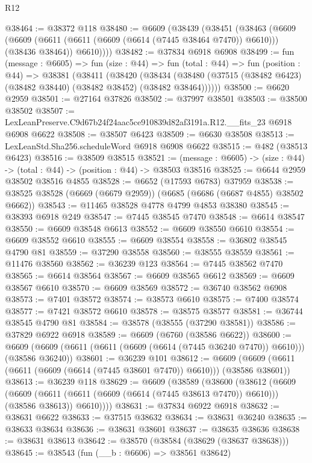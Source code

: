 \begin{lexlean}{R12}
\begin{coremodule}
@38464 := @38372 @118
@38480 := @6609
    (@38439
      (@38451
        (@38463
          (@6609
            (@6609 (@6611 (@6611 (@6609 (@6614 (@7445 @38464 @7470)) @6610))) (@38436 @38464))
            @6610))))
@38482 := @37834 @6918 @6908
@38499 := fun (message : @6605) =>
  fun (size : @44) =>
  fun (total : @44) =>
  fun (position : @44) =>
  @38381
    (@38411
      (@38420
        (@38434 (@38480 (@37515 (@38482 @6423) (@38482 @38440) (@38482 @38452) (@38482 @38464))))))
@38500 := @6620 @2959
@38501 := @27164 @37826
@38502 := @37997 @38501
@38503 := @38500 @38502
@38507 := LexLeanPreserve.C9d67b24f24aac5ce910839d82af3191a.R12.__fits_23 @6918 @6908 @6622
@38508 := @38507 @6423
@38509 := @6630 @38508
@38513 := LexLeanStd.Sha256.scheduleWord @6918 @6908 @6622
@38515 := @482 (@38513 @6423)
@38516 := @38509 @38515
@38521 := (message : @6605) -> (size : @44) -> (total : @44) -> (position : @44) -> @38503 @38516
@38525 := @6644 @2959 @38502 @38516 @4855
@38528 := @6652 (@17593 @6783) @37959
@38538 := @38525 @38528 (@6669 (@6679 @2959)) (@6685 (@6686 (@6687 @4855) @38502 @6662))
@38543 := @11465 @38528 @4778 @4799 @4853 @38380
@38545 := @38393 @6918 @249
@38547 := @7445 @38545 @7470
@38548 := @6614 @38547
@38550 := @6609 @38548 @6613
@38552 := @6609 @38550 @6610
@38554 := @6609 @38552 @6610
@38555 := @6609 @38554
@38558 := @36802 @38545 @4790 @81
@38559 := @37290 @38558
@38560 := @38555 @38559
@38561 := @11476 @38560
@38562 := @36239 @123
@38564 := @7445 @38562 @7470
@38565 := @6614 @38564
@38567 := @6609 @38565 @6612
@38569 := @6609 @38567 @6610
@38570 := @6609 @38569
@38572 := @36740 @38562 @6908
@38573 := @7401 @38572
@38574 := @38573 @6610
@38575 := @7400 @38574
@38577 := @7421 @38572 @6610
@38578 := @38575 @38577
@38581 := @36744 @38545 @4790 @81
@38584 := @38578 (@38555 (@37290 @38581))
@38586 := @37829 @6922 @6918
@38589 := @6609 (@6760 (@38586 @6622))
@38600 := @6609 (@6609 (@6611 (@6611 (@6609 (@6614 (@7445 @36240 @7470)) @6610))) (@38586 @36240))
@38601 := @36239 @101
@38612 := @6609 (@6609 (@6611 (@6611 (@6609 (@6614 (@7445 @38601 @7470)) @6610))) (@38586 @38601))
@38613 := @36239 @118
@38629 := @6609
    (@38589
      (@38600
        (@38612
          (@6609
            (@6609 (@6611 (@6611 (@6609 (@6614 (@7445 @38613 @7470)) @6610))) (@38586 @38613))
            @6610))))
@38631 := @37834 @6922 @6918
@38632 := @38631 @6622
@38633 := @37515 @38632
@38634 := @38631 @36240
@38635 := @38633 @38634
@38636 := @38631 @38601
@38637 := @38635 @38636
@38638 := @38631 @38613
@38642 := @38570 (@38584 (@38629 (@38637 @38638)))
@38645 := @38543 (fun (__b : @6606) => @38561 @38642)

\end{coremodule}
\end{lexlean}
